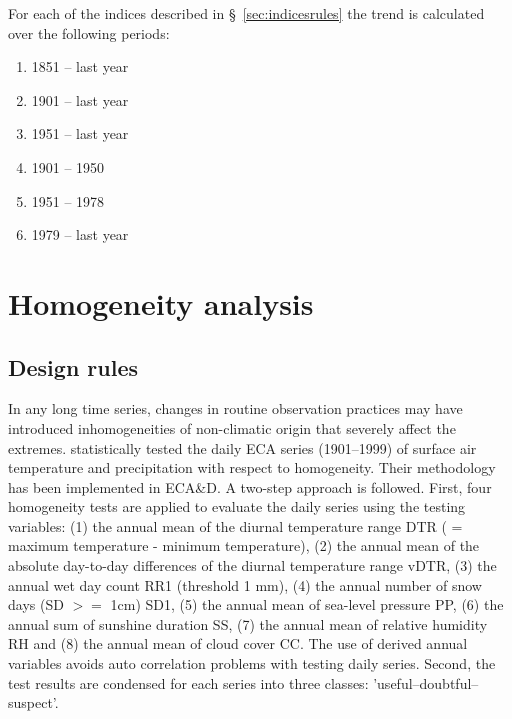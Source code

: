 \documentclass[a4paper,11pt]{article}
\begin{document}
For each of the indices described in \S~\ref{sec:indicesrules} the trend is calculated over the following periods:

\begin{enumerate}
\item 1851 -- last year
\item 1901 -- last year
\item 1951 -- last year
\item 1901 -- 1950
\item 1951 -- 1978
\item 1979 -- last year
\end{enumerate}


\section{Homogeneity analysis}
\label{sec:homo}
\subsection{Design rules}
\label{sec:homorules}

In any long time series, changes in routine observation practices may
have introduced inhomogeneities of non-climatic origin that severely
affect the extremes. \citet{wijngaard} statistically tested the daily
ECA series (1901--1999) of surface air temperature and precipitation
with respect to homogeneity. Their methodology has been implemented in
ECA\&D. A two-step approach is followed. First, four homogeneity tests
are applied to evaluate the daily series using the testing variables:
(1) the annual mean of the diurnal temperature range DTR ( = maximum
temperature - minimum temperature), (2) the annual mean of the
absolute day-to-day differences of the diurnal temperature range vDTR,
(3) the annual wet day count RR1 (threshold 1 mm), (4) the annual number 
of snow days (SD $>=$ 1cm) SD1, (5) the annual mean of sea-level pressure PP, 
(6) the annual sum of sunshine duration SS, (7) the annual mean of relative
humidity RH and (8) the annual mean of cloud cover CC. The use of
derived annual variables avoids auto correlation problems with testing
daily series. Second, the test results are condensed for each series
into three classes: 'useful--doubtful--suspect'.
\end{document}
